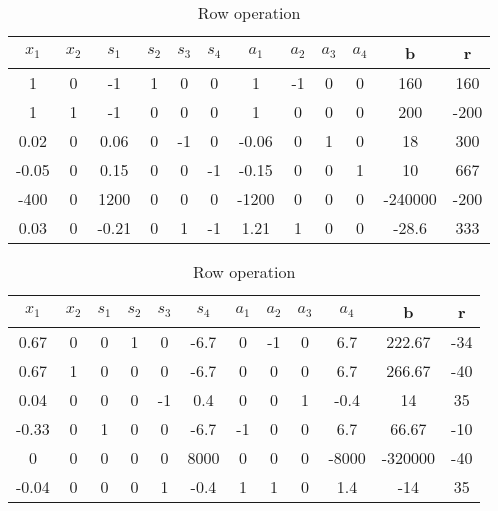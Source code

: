\documentclass{article}
\begin{document}
  \begin{table}[H]
  \centering
  \caption{Row operation}
  \label{my-label}
  \begin{tabular}{|c|c|c|c|c|c|c|c|c|c|c|c|}
  \hline
  $x_1$ & $x_2$ & $s_1$  & $s_2$ & $s_3$ & $s_4$ & $a_1$ & $a_2$ & $a_3$ & $a_4$ & b & r  \\ \hline
  1     & 0      & -1       & 1       & 0    & 0    & 1        & -1    & 0    & 0 & 160       & 160\\ \hline
  1     & 1      & -1       & 0       & 0    & 0    & 1        & 0     & 0    & 0 & 200       & -200\\ \hline
  0.02  & 0      & 0.06     & 0       & -1   & 0    & -0.06    & 0     & 1    & 0 & 18        & 300\\ \hline
  -0.05 & 0      & 0.15     & 0       & 0    & -1   & -0.15    & 0     & 0    & 1 & 10        & 667\\ \hline
  -400  & 0      & 1200     & 0       & 0    & 0    & -1200    & 0     & 0    & 0 & -240000   & -200\\ \hline
  0.03  & 0      & -0.21    & 0       & 1    & -1   & 1.21     & 1     & 0    & 0 & -28.6     & 333   \\ \hline
  \end{tabular}
  \end{table}

  \begin{table}[H]
  \centering
  \caption{Row operation}
  \label{my-label}
  \begin{tabular}{|c|c|c|c|c|c|c|c|c|c|c|c|}
  \hline
  $x_1$ & $x_2$ & $s_1$  & $s_2$ & $s_3$ & $s_4$ & $a_1$ & $a_2$ & $a_3$ & $a_4$ & b & r  \\ \hline
  0.67     & 0      & 0       & 1       & 0    & -6.7    & 0        & -1    & 0    & 6.7 & 222.67  & -34\\ \hline
  0.67     & 1      & 0       & 0       & 0    & -6.7    & 0        & 0     & 0    & 6.7 & 266.67  & -40\\ \hline
  0.04     & 0      & 0       & 0       & -1   & 0.4     & 0        & 0     & 1   & -0.4   & 14      & 35\\ \hline
  -0.33    & 0      & 1       & 0       & 0    & -6.7    & -1       & 0     & 0    & 6.7  & 66.67   & -10\\ \hline
  0        & 0      & 0       & 0       & 0    & 8000    & 0        & 0     & 0  & -8000 & -320000 & -40\\ \hline
  -0.04    & 0      & 0       & 0       & 1    & -0.4    & 1        & 1     & 0    & 1.4 & -14     & 35 \\ \hline
  \end{tabular}
  \end{table}
\end{document}
